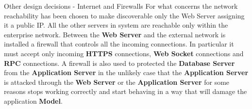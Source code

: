 \documentclass{../common/latex_classes/pdf_presentation}
\begin{document}
	\begin{frame}{Other design decisions - Internet and Firewalls}
		For what concerns the network reachability has been chosen to make discoverable only the Web Server assigning it a public IP.
		All the other servers in \myTaxiService{} system are reachable only within the enterprise network.
		Between the \textbf{Web Server} and the external network is installed a firewall that controls all the incoming connections.
		In particular it must accept only incoming \textbf{HTTPS} connections, \textbf{Web Socket} connections and \textbf{RPC} connections.
		A firewall is also used to protected the \textbf{Database Server} from the \textbf{Application Server} in the unlikely case that the \textbf{Application Server} is attacked through the \textbf{Web Server} or the \textbf{Application Server} for some reasons stops working correctly and start behaving in a way that will damage the application \textbf{Model}.
	\end{frame}
\end{document}
